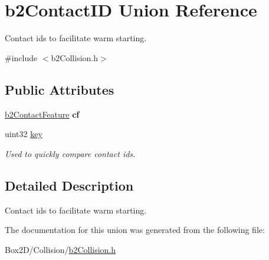 \hypertarget{unionb2_contact_i_d}{}\section{b2\+Contact\+ID Union Reference}
\label{unionb2_contact_i_d}


Contact ids to facilitate warm starting.  




{\ttfamily \#include $<$b2\+Collision.\+h$>$}

\subsection*{Public Attributes}
\begin{DoxyCompactItemize}
\item 
\mbox{\label{unionb2_contact_i_d_a58b6732f909bc760f75e7aff3cd4be08}} 
\hyperlink{structb2_contact_feature}{b2\+Contact\+Feature} {\bfseries cf}
\item 
\mbox{\label{unionb2_contact_i_d_a04c04f8fdcb799b33552d01b3aa3f245}} 
uint32 \hyperlink{unionb2_contact_i_d_a04c04f8fdcb799b33552d01b3aa3f245}{key}
\begin{DoxyCompactList}\small\item\em Used to quickly compare contact ids. \end{DoxyCompactList}\end{DoxyCompactItemize}


\subsection{Detailed Description}
Contact ids to facilitate warm starting. 

The documentation for this union was generated from the following file\+:\begin{DoxyCompactItemize}
\item 
Box2\+D/\+Collision/\hyperlink{b2_collision_8h}{b2\+Collision.\+h}\end{DoxyCompactItemize}
